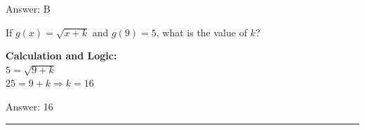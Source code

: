 \documentclass[11pt,paper=a4,answers]{exam}
\begin{document}
\begin{questions}
\begin{solution}
\vspace{30pt}

Answer: \colorbox{yellow!100}{B}
\end{solution}

\vspace{40pt}

\question
If $g(x) = \sqrt{x+k}$ and $g(9) = 5$, what is the value of $k$?

\begin{solution}
\textbf{Calculation and Logic:} \\
$5 = \sqrt{9+k}$ \\
$25 = 9+k \Rightarrow k = 16$

\vspace{30pt}

Answer: \colorbox{yellow!100}{16}
\end{solution}



\end{questions}
\begin{center}
\rule{.5\textwidth}{1pt}
\end{center}
\end{document}

